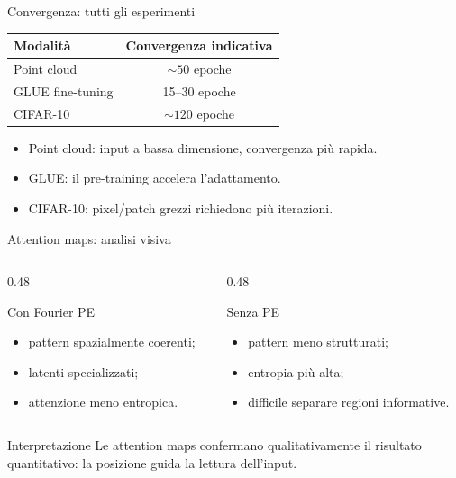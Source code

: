 \documentclass[aspectratio=169,10pt]{beamer}
\begin{document}
\begin{frame}{Convergenza: tutti gli esperimenti}
\small
\begin{center}
\begin{tabular}{lc}
\toprule
\textbf{Modalità} & \textbf{Convergenza indicativa} \\
\midrule
Point cloud & $\sim50$ epoche \\
GLUE fine-tuning & 15--30 epoche \\
CIFAR-10 & $\sim120$ epoche \\
\bottomrule
\end{tabular}
\end{center}

\begin{itemize}
  \item Point cloud: input a bassa dimensione, convergenza più rapida.
  \item GLUE: il pre-training accelera l'adattamento.
  \item CIFAR-10: pixel/patch grezzi richiedono più iterazioni.
\end{itemize}
\end{frame}

\begin{frame}{Attention maps: analisi visiva}
\small
\begin{columns}[T]
\begin{column}{0.48\textwidth}
\begin{exampleblock}{Con Fourier PE}
\begin{itemize}
  \item pattern spazialmente coerenti;
  \item latenti specializzati;
  \item attenzione meno entropica.
\end{itemize}
\end{exampleblock}
\end{column}
\begin{column}{0.48\textwidth}
\begin{alertblock}{Senza PE}
\begin{itemize}
  \item pattern meno strutturati;
  \item entropia più alta;
  \item difficile separare regioni informative.
\end{itemize}
\end{alertblock}
\end{column}
\end{columns}

\begin{block}{Interpretazione}
Le attention maps confermano qualitativamente il risultato quantitativo: la posizione guida la lettura dell'input.
\end{block}
\end{frame}
\end{document}
